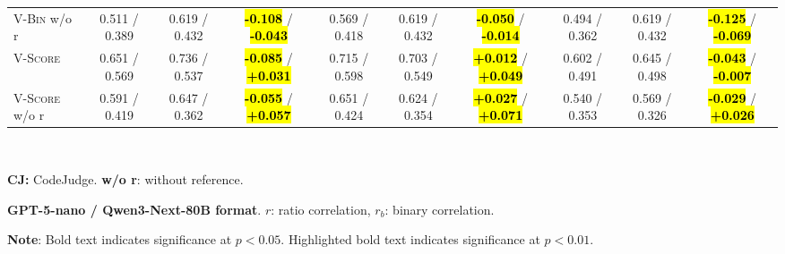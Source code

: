 \begin{table}[t]
\begin{tabular}{@{}
        l|ccc|ccc|ccc@{}}
        \textsc{V-Bin} w/o r    & 0.511 / 0.389   & 0.619 / 0.432   & \hl{\textbf{-0.108}} / \hl{\textbf{-0.043}} & 0.569 / 0.418   & 0.619 / 0.432   & \hl{\textbf{-0.050}} / \hl{\textbf{-0.014}} & 0.494 / 0.362   & 0.619 / 0.432   & \hl{\textbf{-0.125}} / \hl{\textbf{-0.069}} \\
        \textsc{V-Score}        & 0.651 / 0.569   & 0.736 / 0.537   & \hl{\textbf{-0.085}} / \hl{\textbf{+0.031}} & 0.715 / 0.598   & 0.703 / 0.549   & \hl{\textbf{+0.012}} / \hl{\textbf{+0.049}} & 0.602 / 0.491   & 0.645 / 0.498   & \hl{\textbf{-0.043}} / \hl{\textbf{-0.007}} \\
        \textsc{V-Score} w/o r  & 0.591 / 0.419   & 0.647 / 0.362   & \hl{\textbf{-0.055}} / \hl{\textbf{+0.057}} & 0.651 / 0.424   & 0.624 / 0.354   & \hl{\textbf{+0.027}} / \hl{\textbf{+0.071}} & 0.540 / 0.353   & 0.569 / 0.326   & \hl{\textbf{-0.029}} / \hl{\textbf{+0.026}} \\
        \bottomrule
    \end{tabular}\\
    \begin{description}[itemsep=-3pt,topsep=0pt]
        \item \textbf{CJ:} CodeJudge. \hspace{10pt} \textbf{w/o r}: without reference.
        \item \textbf{GPT-5-nano / Qwen3-Next-80B format}. $r$: ratio correlation, $r_b$: binary correlation.
        \item \textbf{Note}: Bold text indicates significance at $p < 0.05$. Highlighted bold text indicates significance at $p < 0.01$.
    \end{description}
\end{table}